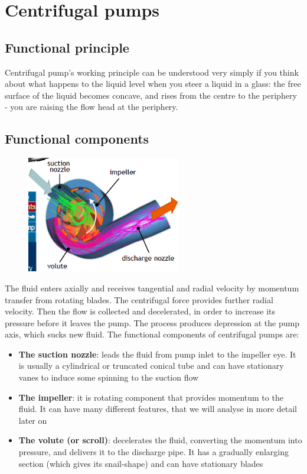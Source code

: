 \documentclass[class=report, crop=false, 12pt,a4paper]{standalone}
\begin{document}
\section{Centrifugal pumps}
\subsection{Functional principle}
Centrifugal pump's working principle can be understood very simply if you think about what happens to the liquid level when you steer a liquid in a glass: the free surface of the liquid becomes concave, and rises from the centre to the periphery - you are raising the flow head at the periphery.
\subsection{Functional components}
\begin{figure}[H]
  \centering
  \includegraphics[width = 0.6\textwidth]{../img/diagram1.png}
\end{figure}
The fluid enters axially and receives tangential and radial velocity by momentum transfer from rotating blades. The centrifugal force provides further radial velocity. Then the flow is collected and decelerated, in order to increase its pressure before it leaves the pump. The process produces depression at the pump axis, which sucks new fluid. The functional components of centrifugal pumps are:
\begin{itemize}
  \item \textbf{The suction nozzle}: leads the fluid from pump inlet to the impeller eye. It is usually a cylindrical or truncated conical tube and can have stationary vanes to induce some spinning to the suction flow
  \item \textbf{The impeller}: it is rotating component that provides momentum to the fluid. It can have many different features, that we will analyse in more detail later on
  \item \textbf{The volute (or scroll)}: decelerates the fluid, converting the momentum into pressure, and delivers it to the discharge pipe. It has a gradually enlarging section (which gives its snail-shape) and can have stationary blades
\end{itemize}
\end{document}
